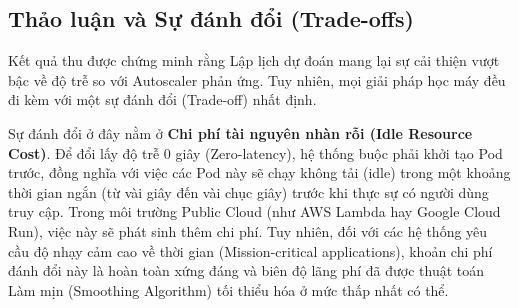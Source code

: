 \subsection{Thảo luận và Sự đánh đổi (Trade-offs)}
Kết quả thu được chứng minh rằng Lập lịch dự đoán mang lại sự cải thiện vượt bậc về độ trễ so với Autoscaler phản ứng. Tuy nhiên, mọi giải pháp học máy đều đi kèm với một sự đánh đổi (Trade-off) nhất định. 

Sự đánh đổi ở đây nằm ở \textbf{Chi phí tài nguyên nhàn rỗi (Idle Resource Cost)}. Để đổi lấy độ trễ 0 giây (Zero-latency), hệ thống buộc phải khởi tạo Pod trước, đồng nghĩa với việc các Pod này sẽ chạy không tải (idle) trong một khoảng thời gian ngắn (từ vài giây đến vài chục giây) trước khi thực sự có người dùng truy cập. Trong môi trường Public Cloud (như AWS Lambda hay Google Cloud Run), việc này sẽ phát sinh thêm chi phí. Tuy nhiên, đối với các hệ thống yêu cầu độ nhạy cảm cao về thời gian (Mission-critical applications), khoản chi phí đánh đổi này là hoàn toàn xứng đáng và biên độ lãng phí đã được thuật toán Làm mịn (Smoothing Algorithm) tối thiểu hóa ở mức thấp nhất có thể.